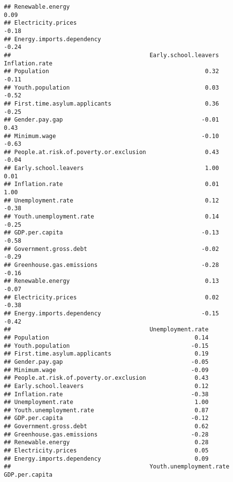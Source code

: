 \documentclass[
]{article}
\begin{document}
\begin{verbatim}
## Renewable.energy                                                         0.09
## Electricity.prices                                                      -0.18
## Energy.imports.dependency                                               -0.24
##                                        Early.school.leavers Inflation.rate
## Population                                             0.32          -0.11
## Youth.population                                       0.03          -0.52
## First.time.asylum.applicants                           0.36          -0.25
## Gender.pay.gap                                        -0.01           0.43
## Minimum.wage                                          -0.10          -0.63
## People.at.risk.of.poverty.or.exclusion                 0.43          -0.04
## Early.school.leavers                                   1.00           0.01
## Inflation.rate                                         0.01           1.00
## Unemployment.rate                                      0.12          -0.38
## Youth.unemployment.rate                                0.14          -0.25
## GDP.per.capita                                        -0.13          -0.58
## Government.gross.debt                                 -0.02          -0.29
## Greenhouse.gas.emissions                              -0.28          -0.16
## Renewable.energy                                       0.13          -0.07
## Electricity.prices                                     0.02          -0.38
## Energy.imports.dependency                             -0.15          -0.42
##                                        Unemployment.rate
## Population                                          0.14
## Youth.population                                   -0.15
## First.time.asylum.applicants                        0.19
## Gender.pay.gap                                     -0.05
## Minimum.wage                                       -0.09
## People.at.risk.of.poverty.or.exclusion              0.43
## Early.school.leavers                                0.12
## Inflation.rate                                     -0.38
## Unemployment.rate                                   1.00
## Youth.unemployment.rate                             0.87
## GDP.per.capita                                     -0.12
## Government.gross.debt                               0.62
## Greenhouse.gas.emissions                           -0.28
## Renewable.energy                                    0.28
## Electricity.prices                                  0.05
## Energy.imports.dependency                           0.09
##                                        Youth.unemployment.rate GDP.per.capita

\end{verbatim}
\end{document}
